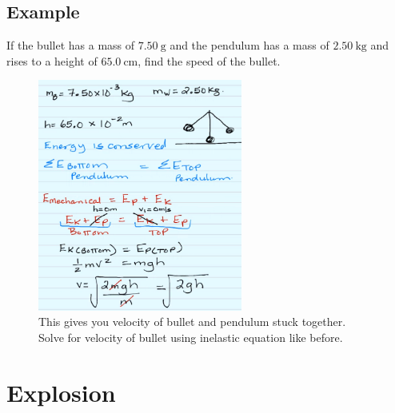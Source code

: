 \documentclass[a4paper,12pt]{article}
\begin{document}
\subsection{Example}
If the bullet has a mass of $\SI{7.50}{\g}$ and the pendulum has a mass of $\SI{2.50}{\kg}$ and rises to a height of $\SI{65.0}{\cm}$, find the speed of the bullet.

\begin{figure}[H]
    \centering
    \includegraphics[width=0.6\textwidth]{q-pend-1a}
    \caption{This gives you velocity of bullet and pendulum stuck together. \\Solve for velocity of bullet using inelastic equation like before.}
\end{figure}

\section{Explosion}
\end{document}
